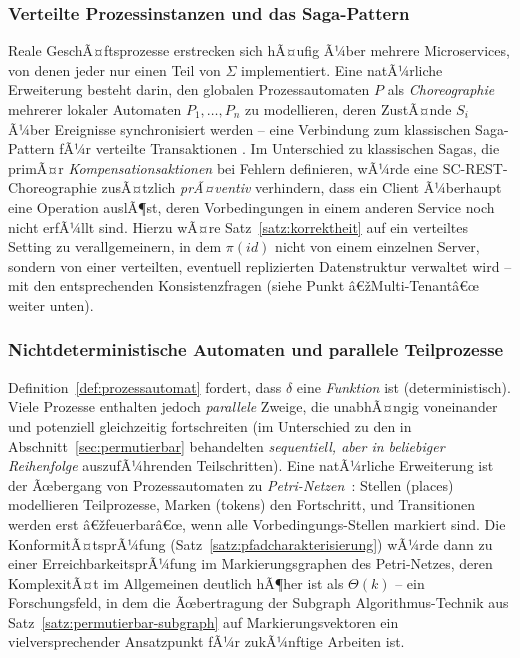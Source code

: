 ﻿\documentclass[a4paper,12pt]{article}
\theoremstyle{definition}
\begin{document}
\subsubsection{Verteilte Prozessinstanzen und das Saga-Pattern}

Reale GeschÃ¤ftsprozesse erstrecken sich hÃ¤ufig Ã¼ber mehrere Microservices, von denen jeder
nur einen Teil von $\Sigma$ implementiert. Eine natÃ¼rliche Erweiterung besteht darin, den
globalen Prozessautomaten $P$ als \emph{Choreographie} mehrerer lokaler Automaten
$P_1,\ldots,P_n$ zu modellieren, deren ZustÃ¤nde $S_i$ Ã¼ber Ereignisse synchronisiert
werden -- eine Verbindung zum klassischen Saga-Pattern fÃ¼r verteilte Transaktionen
\cite{garcia1987}. Im Unterschied zu klassischen Sagas, die primÃ¤r
\emph{Kompensationsaktionen} bei Fehlern definieren, wÃ¼rde eine SC-REST-Choreographie
zusÃ¤tzlich \emph{prÃ¤ventiv} verhindern, dass ein Client Ã¼berhaupt eine Operation auslÃ¶st,
deren Vorbedingungen in einem anderen Service noch nicht erfÃ¼llt sind. Hierzu wÃ¤re
Satz~\ref{satz:korrektheit} auf ein verteiltes Setting zu verallgemeinern, in dem $\pi(id)$
nicht von einem einzelnen Server, sondern von einer verteilten, eventuell replizierten
Datenstruktur verwaltet wird -- mit den entsprechenden Konsistenzfragen (siehe Punkt
â€žMulti-Tenantâ€œ weiter unten).

\subsubsection{Nichtdeterministische Automaten und parallele Teilprozesse}

Definition~\ref{def:prozessautomat} fordert, dass $\delta$ eine \emph{Funktion} ist
(deterministisch). Viele Prozesse enthalten jedoch \emph{parallele} Zweige, die
unabhÃ¤ngig voneinander und potenziell gleichzeitig fortschreiten (im Unterschied zu den in
Abschnitt~\ref{sec:permutierbar} behandelten \emph{sequentiell, aber in beliebiger
Reihenfolge} auszufÃ¼hrenden Teilschritten). Eine natÃ¼rliche Erweiterung ist der Ãœbergang
von Prozessautomaten zu \emph{Petri-Netzen}~\cite{murata1989}: Stellen (places)
modellieren Teilprozesse, Marken (tokens) den Fortschritt, und Transitionen werden erst
â€žfeuerbarâ€œ, wenn alle Vorbedingungs-Stellen markiert sind. Die KonformitÃ¤tsprÃ¼fung
(Satz~\ref{satz:pfadcharakterisierung}) wÃ¼rde dann zu einer ErreichbarkeitsprÃ¼fung im
Markierungsgraphen des Petri-Netzes, deren KomplexitÃ¤t im Allgemeinen deutlich hÃ¶her ist
als $\Theta(k)$ -- ein Forschungsfeld, in dem die Ãœbertragung der
Subgraph Algorithmus-Technik aus Satz~\ref{satz:permutierbar-subgraph} auf
Markierungsvektoren ein vielversprechender Ansatzpunkt fÃ¼r zukÃ¼nftige Arbeiten ist.
\end{document}
